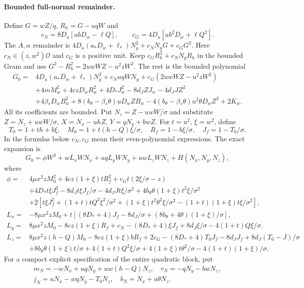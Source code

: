\paragraph{Bounded full-normal remainder.}
Define $G=wZ/q$, $R_h=G-uqW$ and
\[
c_N=8D_u[abD_w-\ell Q],\qquad c_G=4D_u[ab^2D_w+\ell Q^2].
\]
The $A,\alpha$ remainder is
$4D_u(a_*D_w+\ell_*)N_y^2+c_NN_yG+c_GG^2$.
Here $c_N\in(z,w^2)\mathcal O$ and $c_G$ is a positive unit.
Keep $c_GR_h^2+c_NN_yR_h$ in the bounded Gram and use
$G^2-R_h^2=2uwWZ-u^2zW^2$. The rest is the bounded polynomial
\begin{align*}
G_0={}&4D_u(a_*D_w+\ell_*)N_y^2+c_NuqWN_y+c_G(2uwWZ-u^2zW^2)\\
&+4mM_w^2+4czD_wR_w^2+4D_*J_w^2-8d_JZJ_w-4d_JJZ^2\\
&+4\beta_*D_wB_w^2+8(b_\theta-\beta_*\theta)uD_wZB_w
 -4(b_\theta-\beta_*\theta)u^2\theta D_wZ^2+2K_w.
\end{align*}
All its coefficients are bounded. Put $N_z=Z-uwW/\sigma$ and substitute
$Z=N_z+uwW/\sigma$, $X=N_x-uhZ$, $Y=qN_y+bwZ$.
For $t=u^2$, $\xi=w^2$, define
\[
 T_0=1+th+b\xi,\quad M_0=1+t(h-Q)\xi/\sigma,\quad
 R_f=1-b\xi/\sigma,\quad J_f=1-T_0/\sigma.
\]
In the formulas below $c_N,c_G$ mean their even-polynomial expressions.
The exact expansion is
\[
G_0=\phi W^2+wL_xWN_x+uqL_yWN_y+uwL_zWN_z+H(N_x,N_y,N_z),
\]
where
\begin{align*}
\phi={}&4\mu x^2zM_0^2+4cz(1+\xi)tR_f^2+c_Gt(2\xi/\sigma-z)\\
 &+4D_*t\xi J_f^2-8d_Jt\xi J_f/\sigma-4d_JJt\xi/\sigma^2
 +4b_\theta\theta(1+\xi)t^2\xi/\sigma^2\\
 &+2[t\xi J_f^2+(1+t)tQ^2\xi^2/\sigma^2
 +(1+\xi)t^2\theta^2\xi/\sigma^2-(1+t)(1+\xi)t\xi/\sigma^2],\\
L_x={}&-8\mu x^2zM_0+t[(8D_*+4)J_f-8d_J/\sigma
 +(8b_\theta+4\theta)(1+\xi)/\sigma],\\
L_y={}&8\mu x^2zM_0-8cz(1+\xi)R_f+c_N-(8D_*+4)\xi J_f
 +8d_J\xi/\sigma-4(1+t)Q\xi/\sigma,\\
L_z={}&8\mu x^2z(h-Q)M_0-8cz(1+\xi)bR_f+2c_G
 -(8D_*+4)T_0J_f-8d_JJ_f+8d_J(T_0-J)/\sigma\\
 &+8b_\theta\theta(1+\xi)t/\sigma+4(1+t)Q^2\xi/\sigma
 +4(1+\xi)t\theta^2/\sigma-4(1+t)(1+\xi)/\sigma.
\end{align*}
For a compact explicit specification of the entire quadratic block, put
\[
\begin{gathered}
m_N=-wN_x+uqN_y+uw(h-Q)N_z,\quad
r_N=-qN_y-bwN_z,\\
j_N=uN_x-wqN_y-T_0N_z,\quad
b_N=N_x+u\theta N_z.
\end{gathered}
\]

